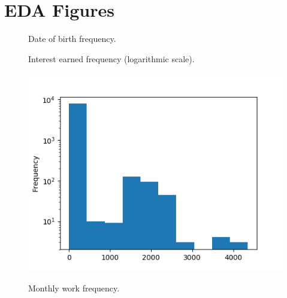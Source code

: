 \section{EDA Figures}

\begin{figure}[!h]
\begin{minipage}{.45\textwidth}
    \caption{Date of birth frequency.}
    \label{fig:birth_date_freq}
    \centering
    \scalebox{0.5}{}
\end{minipage}
\begin{minipage}{.45\textwidth}
    \caption{Interest earned frequency (logarithmic scale).}
    \label{fig:interest_earned_freq}
    \centering
%    
    \includegraphics[width=1.2\textwidth]{./img/interest_earned_freq.png}
\end{minipage}
\begin{minipage}{.45\textwidth}
    \caption{Monthly work frequency.}
    \label{fig:monthly_work_freq}
    \centering
    \scalebox{0.5}{}
\end{minipage}
\end{figure}

